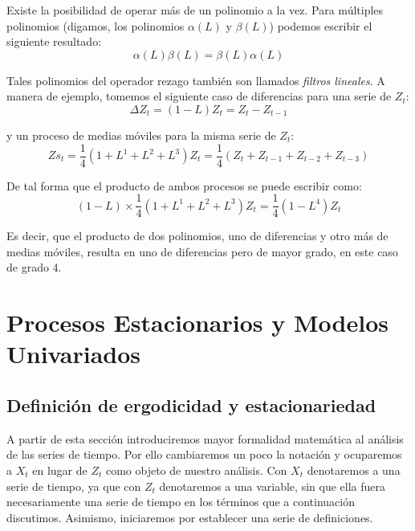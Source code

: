 \documentclass[
]{book}
\begin{document}
Existe la posibilidad de operar más de un polinomio a la vez. Para múltiples polinomios (digamos, los polinomios \(\alpha(L)\) y \(\beta(L)\)) podemos escribir el siguiente resultado:
\begin{equation}
    \alpha(L) \beta(L) = \beta(L) \alpha(L)
    \label{eq:Diff7}
\end{equation}

Tales polinomios del operador rezago también son llamados \emph{filtros lineales}. A manera de ejemplo, tomemos el siguiente caso de diferencias para una serie de \(Z_t\):
\begin{equation}
    \Delta Z_{t} = (1 - L) Z_{t} = Z_{t} - Z_{t-1} 
    \label{eq:Diff8}
\end{equation}

y un proceso de medias móviles para la misma serie de \(Z_t\):
\begin{equation}
    Zs_{t} = \frac{1}{4}(1 + L^1 + L^2 + L^3) Z_{t} = \frac{1}{4}(Z_{t} + Z_{t-1} + Z_{t-2} + Z_{t-3}) 
    \label{eq:Diff9}
\end{equation}

De tal forma que el producto de ambos procesos se puede escribir como:
\begin{equation}
(1 - L) \times \frac{1}{4}(1 + L^1 + L^2 + L^3) Z_{t} = \frac{1}{4}(1 - L^4) Z_{t}
\label{eq:Diff10}
\end{equation}

Es decir, que el producto de dos polinomios, uno de diferencias y otro más de medias móviles, resulta en uno de diferencias pero de mayor grado, en este caso de grado 4.

\hypertarget{procesos-estacionarios-y-modelos-univariados}{%
\chapter{Procesos Estacionarios y Modelos Univariados}\label{procesos-estacionarios-y-modelos-univariados}}

\hypertarget{definiciuxf3n-de-ergodicidad-y-estacionariedad}{%
\section{Definición de ergodicidad y estacionariedad}\label{definiciuxf3n-de-ergodicidad-y-estacionariedad}}

A partir de esta sección introduciremos mayor formalidad matemática al análisis de las series de tiempo. Por ello cambiaremos un poco la notación y ocuparemos a \(X_t\) en lugar de \(Z_t\) como objeto de nuestro análisis. Con \(X_t\) denotaremos a una serie de tiempo, ya que con \(Z_t\) denotaremos a una variable, sin que ella fuera necesariamente una serie de tiempo en los términos que a continuación discutimos. Asimismo, iniciaremos por establecer una serie de definiciones.
\end{document}
